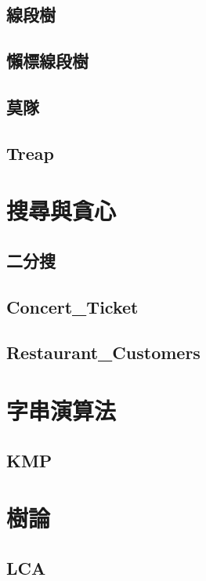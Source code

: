 \subsection{線段樹}

\subsection{懶標線段樹}

\subsection{莫隊}

\subsection{Treap}


\section{搜尋與貪心}
\subsection{二分搜} 

\subsection{Concert_Ticket}

\subsection{Restaurant_Customers}


\section{字串演算法}
\subsection{KMP} 


\section{樹論}
\subsection{LCA} 

